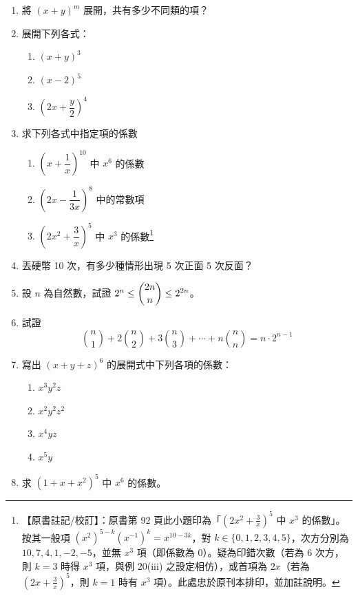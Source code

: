 \begin{enumerate}[label=\arabic*.]
  \item 將 $(x + y)^m$ 展開，共有多少不同類的項？
  \item 展開下列各式：
  \begin{enumerate}[label=(\arabic*)]
    \item $(x + y)^3$
    \item $(x - 2)^5$
    \item $\left(2x + \dfrac{y}{2}\right)^4$
  \end{enumerate}
  \item 求下列各式中指定項的係數
  \begin{enumerate}[label=(\arabic*)]
    \item $\left(x + \dfrac{1}{x}\right)^{10}$ 中 $x^6$ 的係數
    \item $\left(2x - \dfrac{1}{3x}\right)^8$ 中的常數項
    \item $\left(2x^2 + \dfrac{3}{x}\right)^5$ 中 $x^3$ 的係數\label{note:b5s-ch2-p92-q3-3}\footnote{【原書註記/校訂】：原書第 92 頁此小題印為「$\left(2x^2 + \frac{3}{x}\right)^5$ 中 $x^3$ 的係數」。按其一般項 $(x^2)^{5-k}(x^{-1})^k = x^{10-3k}$，對 $k \in \{0, 1, 2, 3, 4, 5\}$，次方分別為 $10, 7, 4, 1, -2, -5$，並無 $x^3$ 項（即係數為 0）。疑為印錯次數（若為 6 次方，則 $k=3$ 時得 $x^3$ 項，與例 20(iii) 之設定相仿），或首項為 $2x$（若為 $(2x + \frac{3}{x})^5$，則 $k=1$ 時有 $x^3$ 項）。此處忠於原刊本排印，並加註說明。}
  \end{enumerate}
  \item 丟硬幣 10 次，有多少種情形出現 5 次正面 5 次反面？
  \item 設 $n$ 為自然數，試證 $2^n \le \dbinom{2n}{n} \le 2^{2n}$。
  \item[*6.] 試證
  \[ \binom{n}{1} + 2\binom{n}{2} + 3\binom{n}{3} + \dotsb + n\binom{n}{n} = n \cdot 2^{n-1} \]
  \item 寫出 $(x + y + z)^6$ 的展開式中下列各項的係數：
  \begin{enumerate}[label=(\arabic*)]
    \item $x^3 y^2 z$
    \item $x^2 y^2 z^2$
    \item $x^4 y z$
    \item $x^5 y$
  \end{enumerate}
  \item[*8.] 求 $(1 + x + x^2)^5$ 中 $x^6$ 的係數。
\end{enumerate}


